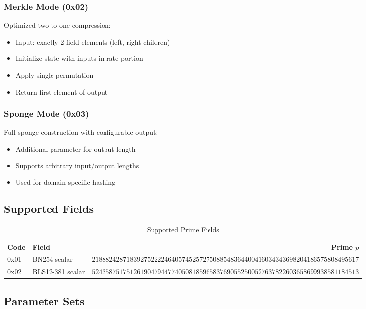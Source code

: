 \documentclass[11pt,a4paper]{article}
\begin{document}
\subsubsection{Merkle Mode (0x02)}
Optimized two-to-one compression:
\begin{itemize}
    \item Input: exactly 2 field elements (left, right children)
    \item Initialize state with inputs in rate portion
    \item Apply single permutation
    \item Return first element of output
\end{itemize}

\subsubsection{Sponge Mode (0x03)}
Full sponge construction with configurable output:
\begin{itemize}
    \item Additional parameter for output length
    \item Supports arbitrary input/output lengths
    \item Used for domain-specific hashing
\end{itemize}

\subsection{Supported Fields}

\begin{table}[htbp]
\centering
\caption{Supported Prime Fields}
\label{tab:fields}
\begin{tabular}{@{}llr@{}}
\toprule
Code & Field & Prime $p$ \\
\midrule
0x01 & BN254 scalar & $21888242871839275222246405745257275088548364400416034343698204186575808495617$ \\
0x02 & BLS12-381 scalar & $52435875175126190479447740508185965837690552500527637822603658699938581184513$ \\
\bottomrule
\end{tabular}
\end{table}

\subsection{Parameter Sets}
\end{document}
